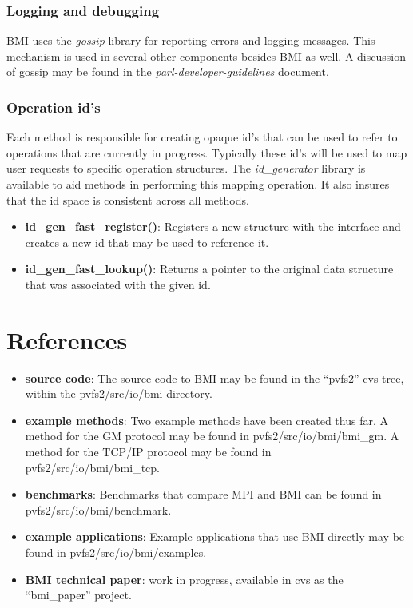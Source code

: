 \documentclass[11pt]{article}
\begin{document}
\subsubsection{Logging and debugging}

BMI uses the \emph{gossip} library for reporting errors and
logging messages.  This mechanism is used in several other
components besides BMI as well.  A discussion of gossip may be
found in the \emph{parl-developer-guidelines} document.

\subsubsection{Operation id's}

Each method is responsible for creating opaque id's that can be used to
refer to operations that are currently in progress.  Typically these
id's will be used to map user requests to specific operation structures.
The \emph{id\_generator} library is available to aid methods in
performing this mapping operation.  It
also insures that the id space is consistent across all methods.

\begin{itemize}
\item \textbf{id\_gen\_fast\_register()}: Registers
a new structure with the interface and creates a new id that may be used
to reference it.
\item \textbf{id\_gen\_fast\_lookup()}:  Returns a pointer to the
original data structure that was associated with the given id.
\end{itemize}

\section{References}
\label{sec:ref}

\begin{itemize}
\item \textbf{source code}: The source code to BMI may be found in the
``pvfs2'' cvs tree, within the pvfs2/src/io/bmi directory.
\item \textbf{example methods}: Two example methods have been created
thus far.  A method for the GM protocol may be found in
pvfs2/src/io/bmi/bmi\_gm.  A method for the TCP/IP protocol may be found
in pvfs2/src/io/bmi/bmi\_tcp.
\item \textbf{benchmarks}:  Benchmarks that compare MPI and BMI
can be found in pvfs2/src/io/bmi/benchmark.   
\item \textbf{example applications}:  Example applications that use BMI
directly may be found in pvfs2/src/io/bmi/examples.   
\item \textbf{BMI technical paper}: work in progress, available in
cvs as the ``bmi\_paper'' project.
\end{itemize}
\end{document}
